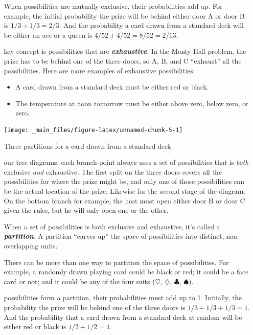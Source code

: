 \documentclass[justified]{tufte-book}
\providecommand{\tightlist}{%
  \setlength{\itemsep}{0pt}\setlength{\parskip}{0pt}}
\begin{document}
When possibilities are mutually exclusive, their probabilities add up. For example, the initial probability the prize will be behind either door A or door B is \(1/3 + 1/3 = 2/3\). And the probability a card drawn from a standard deck will be either an ace or a queen is \(4/52 + 4/52 = 8/52 = 2/13\).

 key concept is possibilities that are \textbf{\emph{exhaustive}}. In the Monty Hall problem, the prize has to be behind one of the three doors, so A, B, and C ``exhaust'' all the possibilities. Here are more examples of exhaustive possibilities:

\begin{itemize}
\tightlist
\item
  A card drawn from a standard deck must be either red or black.
\item
  The temperature at noon tomorrow must be either above zero, below zero, or zero.
\end{itemize}

\begin{marginfigure}
\texttt{[image: \_main\_files/figure-latex/unnamed-chunk-5-1]} \caption[Three  partitions for a card drawn from a standard deck]{Three  partitions for a card drawn from a standard deck}\label{fig:unnamed-chunk-5}
\end{marginfigure}

 our tree diagrams, each branch-point always uses a set of possibilities that is \emph{both} exclusive \emph{and} exhaustive. The first split on the three doors covers all the possibilities for where the prize might be, and only one of those possibilities can be the actual location of the prize. Likewise for the second stage of the diagram. On the bottom branch for example, the host must open either door B or door C given the rules, but he will only open one or the other.

When a set of possibilities is both exclusive and exhaustive, it's called a \textbf{\emph{partition}}. A partition ``carves up'' the space of possibilities into distinct, non-overlapping units.

There can be more than one way to partition the space of possibilities. For example, a randomly drawn playing card could be black or red; it could be a face card or not; and it could be any of the four suits (\(\heartsuit\), \(\diamondsuit\), \(\clubsuit\), \(\spadesuit\)).

 possibilities form a partition, their probabilities must add up to 1. Initially, the probability the prize will be behind one of the three doors is \(1/3 + 1/3 + 1/3 = 1\). And the probability that a card drawn from a standard deck at random will be either red or black is \(1/2 + 1/2 = 1\).
\end{document}
